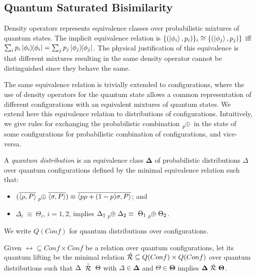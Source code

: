 
\subsection{Quantum Saturated Bisimilarity}

Density operators represents equivalence classes over probabilistic mixtures of quantum states.
The implicit equivalence relation is $\{(\ket{\phi_i}, p_i)\}_i \cong \{(\ket{\phi_j}, p_j)\}$ iff $\sum_{i} p_i \ket{\phi_i}\!\!\bra{\phi_i} = \sum_{j} p_j \ket{\phi_j}\!\!\bra{\phi_j}$.
The physical justification of this equivalence is that different mixtures resulting in the same density operator cannot be distinguished since they behave the same.

The same equivalence relation is trivially extended to configurations, where the use of density operators for the quantum state allows a common representation of different configurations with an equivalent mixtures of quantum states. 
We extend here this equivalence relation to distributions of configurations.
Intuitively, we give rules for exchanging the probabilistic combination $\psum{p}$ in the state of some configurations for probabilistic combination of configurations, and vice-versa. 

\begin{definition}
	A \emph{quantum distribution} is an equivalence class $\mathbf{\Delta}$ of probabilistic distributions $\Delta$ over quantum configurations defined by the minimal equivalence relation such that:
	\begin{itemize}
		\item $(\overline{\confw{\rho, P}} \psum{p} \overline{\confw{\sigma, P}}) \equiv \overline{\confw{p \rho + (1-p)\sigma, P}}$; and
		\item $\Delta_i\ \equiv\ \Theta_i$, $i = 1, 2$, implies $\Delta_1 \psum{p} \Delta_2 \equiv\ \Theta_1 \psum{p} \Theta_2$.
	\end{itemize}
	We write $Q(Conf)$ for quantum distributions over configurations.
\end{definition}

\begin{definition}
	Given $\rel \subseteq Conf \times Conf$ be a relation over quantum configurations, let its quantum lifting be the minimal relation $\hat{\mathcal{R}} \subseteq Q(Conf) \times Q(Conf)$ over quantum distributions such that $\Delta\ \stackrel{\scriptscriptstyle \circ}{\mathcal{R}}\ \Theta$ with $\Delta \in \mathbf{\Delta}$ and $\Theta \in \mathbf{\Theta}$ implies $\mathbf{\Delta}\ \sqlift{\rel}\ \mathbf{\Theta}$.
\end{definition}


